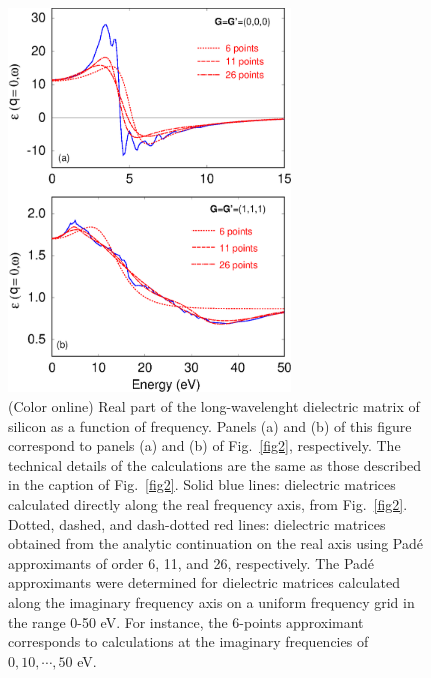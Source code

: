 \documentclass[twocolumn,prb,showpacs,superscriptaddress]{revtex4}
\begin{document}
\begin  {figure}
\begin  {center}
\includegraphics[width=7.5cm]{fig3.eps}
\end    {center}
\caption{\label{fig3}
        (Color online)
        Real part of the long-wavelenght dielectric matrix of silicon as a function of frequency. 
        Panels (a) and (b) of this figure correspond to panels (a) and (b) of Fig.\ \ref{fig2}, respectively. The 
        technical details of the calculations are the same as those described in the caption of Fig.\ \ref{fig2}.
        Solid blue lines: dielectric matrices calculated directly along the real frequency axis,
        from  Fig.\ \ref{fig2}. Dotted, dashed, and dash-dotted red lines: dielectric matrices
        obtained from the analytic continuation on the real axis using Pad\'e approximants of order
        6, 11, and 26, respectively. The Pad\'e approximants were determined for dielectric
        matrices calculated along the imaginary frequency axis on a uniform frequency grid 
        in the range 0-50 eV. For instance, the 6-points approximant corresponds to calculations
        at the imaginary frequencies of $0,10,\cdots,50$ eV.
        }
\end    {figure}
\end{document}
